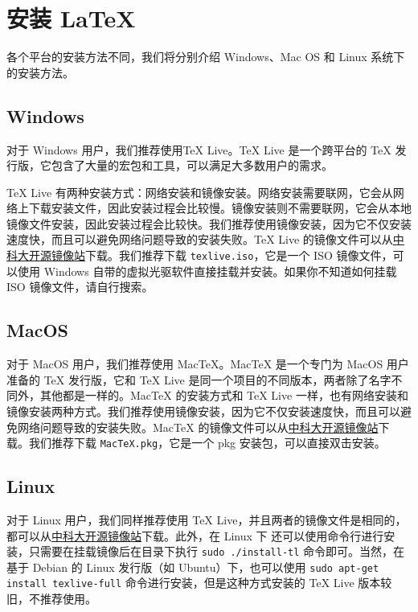 \section{安装 LaTeX}

各个平台的安装方法不同，我们将分别介绍 Windows、Mac OS 和 Linux 系统下的安装方法。

\subsection{Windows}

对于 Windows 用户，我们推荐使用TeX Live。TeX Live 是一个跨平台的 TeX 发行版，它包含了大量的宏包和工具，可以满足大多数用户的需求。

TeX Live 有两种安装方式：网络安装和镜像安装。网络安装需要联网，它会从网络上下载安装文件，因此安装过程会比较慢。镜像安装则不需要联网，它会从本地镜像文件安装，因此安装过程会比较快。我们推荐使用镜像安装，因为它不仅安装速度快，而且可以避免网络问题导致的安装失败。TeX Live 的镜像文件可以从\href{https://mirrors.ustc.edu.cn/CTAN/systems/texlive/Images/}{中科大开源镜像站}下载。我们推荐下载 \texttt{texlive.iso}，它是一个 ISO 镜像文件，可以使用 Windows 自带的虚拟光驱软件直接挂载并安装。如果你不知道如何挂载 ISO 镜像文件，请自行搜索。

\subsection{MacOS}

对于 MacOS 用户，我们推荐使用 MacTeX。MacTeX 是一个专门为 MacOS 用户准备的 TeX 发行版，它和 TeX Live 是同一个项目的不同版本，两者除了名字不同外，其他都是一样的。MacTeX 的安装方式和 TeX Live 一样，也有网络安装和镜像安装两种方式。我们推荐使用镜像安装，因为它不仅安装速度快，而且可以避免网络问题导致的安装失败。MacTeX 的镜像文件可以从\href{https://mirrors.ustc.edu.cn/CTAN/systems/mac/mactex/}{中科大开源镜像站}下载。我们推荐下载 \texttt{MacTeX.pkg}，它是一个 pkg 安装包，可以直接双击安装。

\subsection{Linux}

对于 Linux 用户，我们同样推荐使用 TeX Live，并且两者的镜像文件是相同的，都可以从\href{https://mirrors.ustc.edu.cn/CTAN/systems/texlive/Images/}{中科大开源镜像站}下载。此外，在 Linux 下 还可以使用命令行进行安装，只需要在挂载镜像后在目录下执行 \texttt{sudo ./install-tl} 命令即可。当然，在基于 Debian 的 Linux 发行版（如 Ubuntu）下，也可以使用 \texttt{sudo apt-get install texlive-full} 命令进行安装，但是这种方式安装的 TeX Live 版本较旧，不推荐使用。

